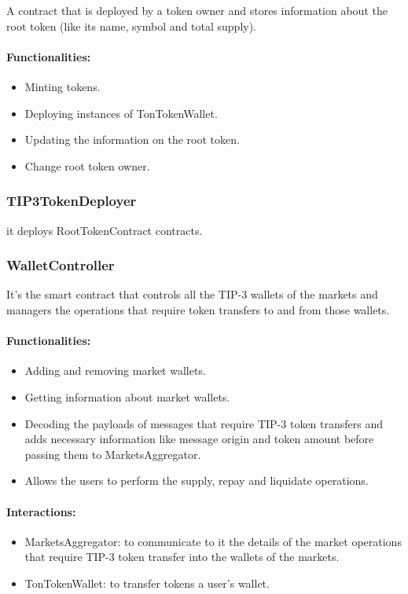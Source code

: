 A contract that is deployed by a token owner and stores information about the root token (like its name, symbol and total supply).

\paragraph*{Functionalities:}
\begin{itemize}
  \item Minting tokens.
  \item Deploying instances of TonTokenWallet.
  \item Updating the information on the root token.
  \item Change root token owner.
\end{itemize}

\subsubsection{TIP3TokenDeployer}

it deploys RootTokenContract contracts.

\subsubsection{WalletController}

It's the smart contract that controls all the TIP-3 wallets of the markets and managers the operations that require token transfers to and from those wallets.

\paragraph*{Functionalities:}
\begin{itemize}
  \item Adding and removing market wallets.
  \item Getting information about market wallets.
  \item Decoding the payloads of messages that require TIP-3 token transfers and adds necessary information like message origin and token amount before passing them to MarketsAggregator.
  \item Allows the users to perform the supply, repay and liquidate operations.
\end{itemize}

\paragraph*{Interactions:}
\begin{itemize}
  \item MarketsAggregator: to communicate to it the details of the market operations that require TIP-3 token transfer into the wallets of the markets.
  \item TonTokenWallet: to transfer tokens a user's wallet.
\end{itemize}

